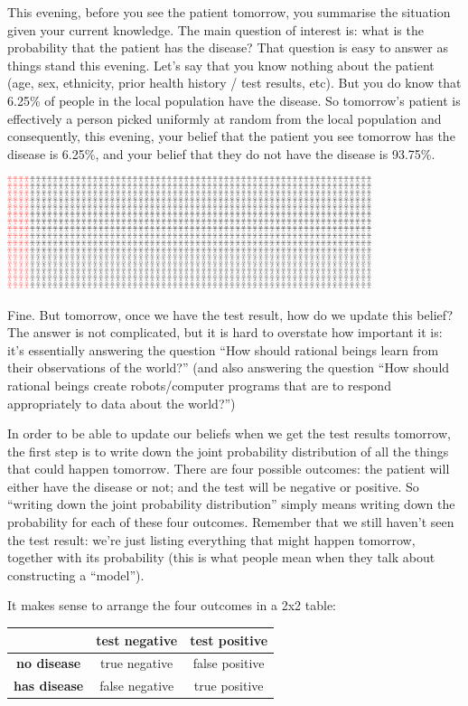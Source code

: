 This evening, before you see the patient tomorrow, you summarise the situation given your current knowledge.
The main question of interest is: what is the probability that the patient has the disease? That question is
easy to answer as things stand this evening. Let's say that you know nothing about the patient (age, sex,
ethnicity, prior health history / test results, etc). But you do know that 6.25\% of people in the local
population have the disease. So tomorrow's patient is effectively a person picked uniformly at random from the
local population and consequently, this evening, your belief that the patient you see tomorrow has the disease
is 6.25\%, and your belief that they do not have the disease is 93.75\%.

\begin{centering}
  \includegraphics[width=0.8\textwidth]{img/statistics-and-machine-learning--introduction--updating-beliefs-1.png}
\end{centering}

Fine. But tomorrow, once we have the test result, how do we update this belief? The answer is not complicated,
but it is hard to overstate how important it is: it's essentially answering the question ``How should rational
beings learn from their observations of the world?​'' (and also answering the question ``How should rational
beings create robots/computer programs that are to respond appropriately to data about the world?'')

In order to be able to update our beliefs when we get the test results tomorrow, the first step is to write
down the joint probability distribution of all the things that could happen tomorrow. There are four possible
outcomes: the patient will either have the disease or not; and the test will be negative or positive. So
``writing down the joint probability distribution​'' simply means writing down the probability for each of these
four outcomes. Remember that we still haven't seen the test result: we're just listing everything that might
happen tomorrow, together with its probability (this is what people mean when they talk about constructing a
``model​'').

It makes sense to arrange the four outcomes in a 2x2 table:
\begin{table}[h!]
  \centering
  \begin{tabular}[h!]{|c|c|c|}
    & {\bf test negative} & {\bf test positive} \\
    \hline
    {\bf no disease} & true negative & false positive\\
    {\bf has disease} & false negative & true positive
  \end{tabular}
\end{table}

